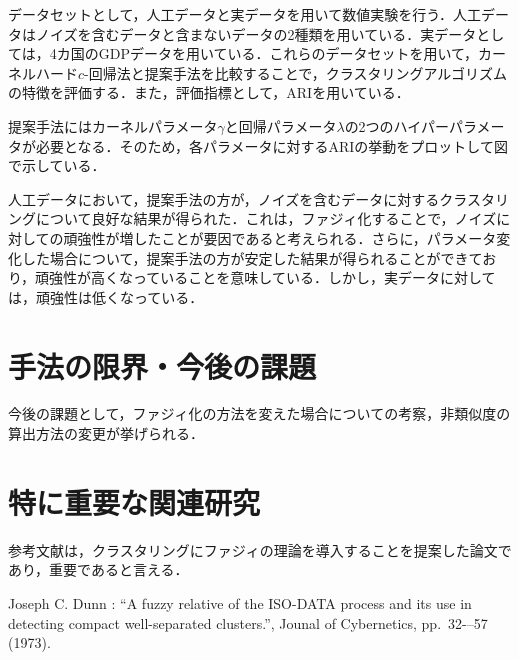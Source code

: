 \documentclass[10pt,onecolumn]{jsarticle}
\begin{document}
データセットとして，人工データと実データを用いて数値実験を行う．人工データはノイズを含むデータと含まないデータの2種類を用いている．実データとしては，4カ国のGDPデータを用いている．これらのデータセットを用いて，カーネルハード$c$-回帰法と提案手法を比較することで，クラスタリングアルゴリズムの特徴を評価する．また，評価指標として，ARIを用いている．

提案手法にはカーネルパラメータ$\gamma$と回帰パラメータ$\lambda$の2つのハイパーパラメータが必要となる．そのため，各パラメータに対するARIの挙動をプロットして図で示している．

人工データにおいて，提案手法の方が，ノイズを含むデータに対するクラスタリングについて良好な結果が得られた．これは，ファジィ化することで，ノイズに対しての頑強性が増したことが要因であると考えられる．さらに，パラメータ変化した場合について，提案手法の方が安定した結果が得られることができており，頑強性が高くなっていることを意味している．しかし，実データに対しては，頑強性は低くなっている．
\section{手法の限界・今後の課題}
今後の課題として，ファジィ化の方法を変えた場合についての考察，非類似度の算出方法の変更が挙げられる．
\section{特に重要な関連研究}
参考文献\cite{ref1}は，クラスタリングにファジィの理論を導入することを提案した論文であり，重要であると言える．

\begin{thebibliography}{99}
%
	Joseph C. Dunn : “A fuzzy relative of the ISO-DATA process and its use in detecting compact well-separated clusters.”, Jounal of Cybernetics, pp.~32-–57 (1973).
%
\end{thebibliography}



\end{document}
